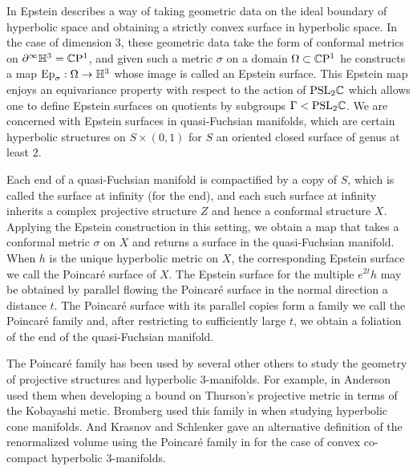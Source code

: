 In \cite{epstein1984} Epstein describes a way of taking geometric data on the ideal boundary of hyperbolic space and obtaining a strictly convex surface in hyperbolic space. 
In the case of dimension 3, these geometric data take the form of conformal metrics on $\partial^\infty \mathbb{H}^3 = \mathbb{C}\mathrm{P}^1$, and given such a metric $\sigma$ on a domain $\Omega \subset \mathbb{C}\mathrm{P}^1$ he constructs a map $\mathrm{Ep}_\sigma: \Omega \to \mathbb{H}^3$ whose image is called an Epstein surface.
This Epstein map enjoys an equivariance property with respect to the action of $\mathrm{PSL}_2\mathbb{C}$ which allows one to define Epstein surfaces on quotients by subgroups $\Gamma < \mathrm{PSL}_2\mathbb{C}$.
We are concerned with Epstein surfaces in quasi-Fuchsian manifolds, which are certain hyperbolic structures on $S \times (0,1)$ for $S$ an oriented closed surface of genus at least 2. 

Each end of a quasi-Fuchsian manifold is compactified by a copy of $S$, which is called the surface at infinity (for the end), and each such surface at infinity inherits a complex projective structure $Z$ and hence a conformal structure $X$. 
Applying the Epstein construction in this setting, we obtain a map that takes a conformal metric $\sigma$ on $X$ and returns a surface in the quasi-Fuchsian manifold.
When $h$ is the unique hyperbolic metric on $X$, the corresponding Epstein surface we call the Poincar\'e surface of $X$. 
The Epstein surface for the multiple $e^{2t}h$ may be obtained by parallel flowing the Poincar\'e surface in the normal direction a distance $t$. 
The Poincar\'e surface with its parallel copies form a family we call the Poincar\'e family and, after restricting to sufficiently large $t$, we obtain a foliation of the end of the quasi-Fuchsian manifold. 

The Poincar\'e family has been used by several other others to study the geometry of projective structures and hyperbolic 3-manifolds. 
For example, in \cite{anderson1998} Anderson used them when developing a bound on Thurson's projective metric in terms of the Kobayashi metic. 
Bromberg used this family in \cite{bromberg2004} when studying hyperbolic cone manifolds. 
And Krasnov and Schlenker gave an alternative definition of the renormalized volume using the Poincar\'e family in \cite{krasnov-schlenker2008} for the case of convex co-compact hyperbolic 3-manifolds. 

